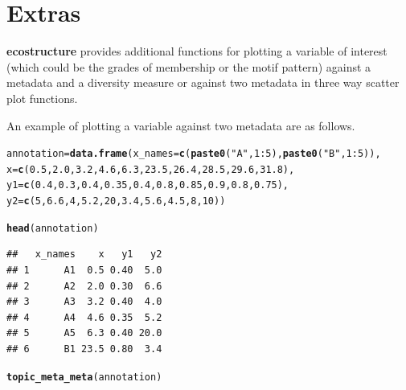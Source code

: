 \documentclass[12pt]{article}\usepackage[]{graphicx}\usepackage[usenames,dvipsnames]{color}
\makeatletter
\newcommand{\hlnum}[1]{\textcolor[rgb]{0.686,0.059,0.569}{#1}}%
\newcommand{\hlstr}[1]{\textcolor[rgb]{0.192,0.494,0.8}{#1}}%
\newcommand{\hlopt}[1]{\textcolor[rgb]{0,0,0}{#1}}%
\newcommand{\hlstd}[1]{\textcolor[rgb]{0.345,0.345,0.345}{#1}}%
\newcommand{\hlkwb}[1]{\textcolor[rgb]{0.69,0.353,0.396}{#1}}%
\newcommand{\hlkwc}[1]{\textcolor[rgb]{0.333,0.667,0.333}{#1}}%
\newcommand{\hlkwd}[1]{\textcolor[rgb]{0.737,0.353,0.396}{\textbf{#1}}}%
\newenvironment{kframe}{%
 \def\at@end@of@kframe{}%
 \ifinner\ifhmode%
  \def\at@end@of@kframe{\end{minipage}}%
  \begin{minipage}{\columnwidth}%
 \fi\fi%
 \def\FrameCommand##1{\hskip\@totalleftmargin \hskip-\fboxsep
 \colorbox{shadecolor}{##1}\hskip-\fboxsep
     \hskip-\linewidth \hskip-\@totalleftmargin \hskip\columnwidth}%
 \MakeFramed {\advance\hsize-\width
   \@totalleftmargin\z@ \linewidth\hsize
   \@setminipage}}%
 {\par\unskip\endMakeFramed%
 \at@end@of@kframe}
\newenvironment{knitrout}{}{} %
\makeatother
\begin{document}
\section{Extras}

\textbf{ecostructure} provides additional functions for plotting a variable of interest (which could be the grades of membership or the motif pattern) against a metadata and a diversity measure or against two metadata in three way scatter plot functions.

An example of plotting a variable against two metadata are as follows.

\begin{knitrout}
\color{fgcolor}\begin{kframe}
\begin{alltt}
\hlstd{annotation} \hlkwb{=} \hlkwd{data.frame}\hlstd{(}\hlkwc{x_names} \hlstd{=} \hlkwd{c}\hlstd{(}\hlkwd{paste0}\hlstd{(}\hlstr{"A"}\hlstd{,}\hlnum{1}\hlopt{:}\hlnum{5}\hlstd{),} \hlkwd{paste0}\hlstd{(}\hlstr{"B"}\hlstd{,}\hlnum{1}\hlopt{:}\hlnum{5}\hlstd{)),}
\hlkwc{x} \hlstd{=} \hlkwd{c}\hlstd{(}\hlnum{0.5}\hlstd{,}\hlnum{2.0}\hlstd{,} \hlnum{3.2}\hlstd{,} \hlnum{4.6}\hlstd{,} \hlnum{6.3}\hlstd{,}  \hlnum{23.5}\hlstd{,} \hlnum{26.4}\hlstd{,} \hlnum{28.5}\hlstd{,} \hlnum{29.6}\hlstd{,} \hlnum{31.8}\hlstd{),}
\hlkwc{y1} \hlstd{=} \hlkwd{c}\hlstd{(}\hlnum{0.4}\hlstd{,} \hlnum{0.3}\hlstd{,} \hlnum{0.4}\hlstd{,} \hlnum{0.35}\hlstd{,} \hlnum{0.4}\hlstd{,} \hlnum{0.8}\hlstd{,} \hlnum{0.85}\hlstd{,} \hlnum{0.9}\hlstd{,} \hlnum{0.8}\hlstd{,} \hlnum{0.75}\hlstd{),}
\hlkwc{y2} \hlstd{=}\hlkwd{c}\hlstd{(}\hlnum{5}\hlstd{,} \hlnum{6.6}\hlstd{,} \hlnum{4}\hlstd{,} \hlnum{5.2}\hlstd{,} \hlnum{20}\hlstd{,} \hlnum{3.4}\hlstd{,} \hlnum{5.6}\hlstd{,} \hlnum{4.5}\hlstd{,} \hlnum{8}\hlstd{,} \hlnum{10}\hlstd{))}

\hlkwd{head}\hlstd{(annotation)}
\end{alltt}
\begin{verbatim}
##   x_names    x   y1   y2
## 1      A1  0.5 0.40  5.0
## 2      A2  2.0 0.30  6.6
## 3      A3  3.2 0.40  4.0
## 4      A4  4.6 0.35  5.2
## 5      A5  6.3 0.40 20.0
## 6      B1 23.5 0.80  3.4
\end{verbatim}
\begin{alltt}
\hlkwd{topic_meta_meta}\hlstd{(annotation)}
\end{alltt}
\end{kframe}
\end{knitrout}
\end{document}
